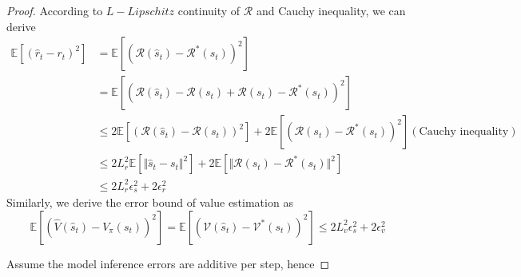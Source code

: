 \begin{proof}
According to $L-Lipschitz$ continuity of $\mathcal{R}$ and Cauchy inequality, we can derive
\begin{equation*}
\begin{aligned}
    \mathbb{E}\left[(\hat{r}_t-r_t)^2\right]&=\mathbb{E}\left[(\mathcal{R}(\hat{s}_t)-\mathcal{R}^*(s_t))^2\right]\\
    &=\mathbb{E}\left[(\mathcal{R}(\hat{s}_t)-\mathcal{R}(s_t)+\mathcal{R}(s_t)-\mathcal{R}^*(s_t))^2\right]\\
    &\leq 2\mathbb{E}\left[(\mathcal{R}(\hat{s}_t)-\mathcal{R}(s_t))^2\right]+2\mathbb{E}\left[(\mathcal{R}(s_t)-\mathcal{R}^*(s_t))^2\right] (\text{Cauchy inequality})\\
    &\leq 2L_r^2\mathbb{E}\left[\Vert\hat{s}_t-s_t\Vert^2\right]+2\mathbb{E}\left[\Vert\mathcal{R}(s_t)-\mathcal{R}^*(s_t)\Vert^2\right]\\
    &\leq 2L_r^2\epsilon_s^2+2\epsilon_r^2
\end{aligned}
\end{equation*}
Similarly, we derive the error bound of value estimation as
\begin{equation*}
    \mathbb{E}\left[\left(\hat{V}(\hat{s}_{t})-V_\pi(s_{t})\right)^2\right]=\mathbb{E}\left[(\mathcal{V}(\hat{s}_t)-\mathcal{V}^*(s_t))^2\right]\leq 2L_v^2\epsilon_s^2+2\epsilon_v^2
\end{equation*}

Assume the model inference errors are additive per step, hence


\end{proof}

